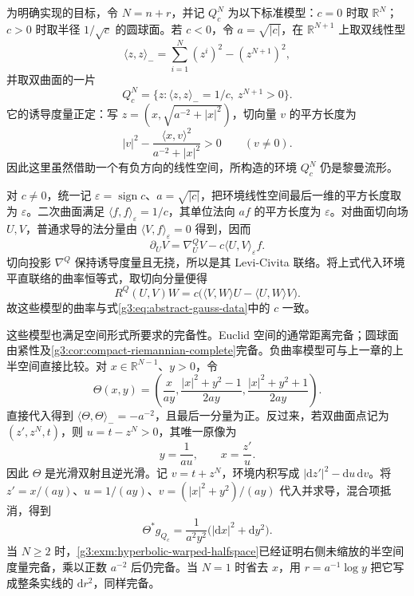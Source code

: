 \ProseParagraphBreak

为明确实现的目标，令 \(N=n+r\)，并记 \(Q_c^N\) 为以下标准模型：\(c=0\) 时取 \(\mathbb R^N\)；\(c>0\) 时取半径 \(1/\sqrt c\) 的圆球面。若 \(c<0\)，令 \(a=\sqrt{|c|}\)，在 \(\mathbb R^{N+1}\) 上取双线性型
\[
	\langle z,z\rangle_-=\sum_{i=1}^N(z^i)^2-(z^{N+1})^2,
\]
并取双曲面的一片
\[
	Q_c^N=\{z:\langle z,z\rangle_-=1/c,\ z^{N+1}>0\}.
\]
它的诱导度量正定：写 \(z=(x,\sqrt{a^{-2}+|x|^2})\)，切向量 \(v\) 的平方长度为
\[
	|v|^2-\frac{\langle x,v\rangle^2}{a^{-2}+|x|^2}>0
	\qquad(v\ne0).
\]
因此这里虽然借助一个有负方向的线性空间，所构造的环境 \(Q_c^N\) 仍是黎曼流形。

\ProseParagraphBreak

对 \(c\ne0\)，统一记 \(\varepsilon=\operatorname{sign}c\)、\(a=\sqrt{|c|}\)，把环境线性空间最后一维的平方长度取为 \(\varepsilon\)。二次曲面满足 \(\langle f,f\rangle_\varepsilon=1/c\)，其单位法向 \(af\) 的平方长度为 \(\varepsilon\)。对曲面切向场 \(U,V\)，普通求导的法分量由 \(\langle V,f\rangle_\varepsilon=0\) 得到，因而
\begin{equation}\label{g3:eq:quadric-ambient-derivative}
	\partial_UV=\nabla^{Q}_UV-c\langle U,V\rangle_\varepsilon f.
\end{equation}
切向投影 \(\nabla^Q\) 保持诱导度量且无挠，所以是其 Levi-Civita 联络。将上式代入环境平直联络的曲率恒等式，取切向分量便得
\[
	R^{Q}(U,V)W=c\bigl(\langle V,W\rangle U-\langle U,W\rangle V\bigr).
\]
故这些模型的曲率与式\eqref{g3:eq:abstract-gauss-data}中的 \(c\) 一致。
\ProseParagraphBreak

这些模型也满足空间形式所要求的完备性。Euclid 空间的通常距离完备；圆球面由紧性及\cref{g3:cor:compact-riemannian-complete}完备。负曲率模型可与上一章的上半空间直接比较。对 \(x\in\mathbb R^{N-1}\)、\(y>0\)，令
\[
	\Theta(x,y)=\left(\frac{x}{ay},
	\frac{|x|^2+y^2-1}{2ay},
	\frac{|x|^2+y^2+1}{2ay}\right).
\]
直接代入得到 \(\langle\Theta,\Theta\rangle_-=-a^{-2}\)，且最后一分量为正。反过来，若双曲面点记为 \((z',z^N,t)\)，则 \(u=t-z^N>0\)，其唯一原像为
\[
	y=\frac1{au},\qquad x=\frac{z'}u.
\]
因此 \(\Theta\) 是光滑双射且逆光滑。记 \(v=t+z^N\)，环境内积写成 \(|\mathrm dz'|^2-\mathrm du\,\mathrm dv\)。将 \(z'=x/(ay)\)、\(u=1/(ay)\)、\(v=(|x|^2+y^2)/(ay)\) 代入并求导，混合项抵消，得到
\[
	\Theta^*g_{Q_c}=\frac1{a^2y^2}\bigl(|\mathrm dx|^2+\mathrm dy^2\bigr).
\]
当 \(N\geq2\) 时，\cref{g3:exm:hyperbolic-warped-halfspace}已经证明右侧未缩放的半空间度量完备，乘以正数 \(a^{-2}\) 后仍完备。当 \(N=1\) 时省去 \(x\)，用 \(r=a^{-1}\log y\) 把它写成整条实线的 \(\mathrm dr^2\)，同样完备。

